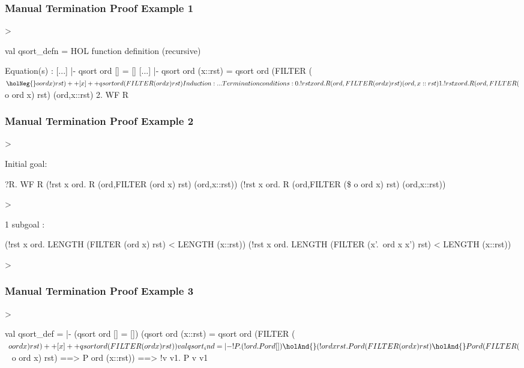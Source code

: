 \begin{frame}[fragile]
\frametitle{Manual Termination Proof Example 1}
\begin{semiverbatim}\scriptsize
> 

val qsort_defn = HOL function definition (recursive)

Equation(s) :
 [...] |- qsort ord [] = []
 [...] |- qsort ord (x::rst) =
            qsort ord (FILTER ($\holNeg{} o ord x) rst) ++ [x] ++
            qsort ord (FILTER (ord x) rst)

Induction : ...

Termination conditions :
  0. !rst x ord. R (ord,FILTER (ord x) rst) (ord,x::rst)
  1. !rst x ord. R (ord,FILTER ($\holNeg{} o ord x) rst) (ord,x::rst)
  2. WF R
\end{semiverbatim}
\end{frame}


\begin{frame}[fragile]
\frametitle{Manual Termination Proof Example 2}
\begin{semiverbatim}\scriptsize
> 

Initial goal:

?R.
  WF R \holAnd{} 
  (!rst x ord. R (ord,FILTER (ord x)      rst) (ord,x::rst)) \holAnd{}
  (!rst x ord. R (ord,FILTER (\$\holNeg{} o ord x) rst) (ord,x::rst))

\pause
> 

1 subgoal :

(!rst x ord. LENGTH (FILTER (ord x) rst) < LENGTH (x::rst)) \holAnd{}
(!rst x ord. LENGTH (FILTER (\textbsl{}x'.\ \holNeg{}ord x x') rst) < LENGTH (x::rst))

> 
\end{semiverbatim}
\end{frame}


\begin{frame}[fragile]
\frametitle{Manual Termination Proof Example 3}
\begin{semiverbatim}\scriptsize
> 

val qsort_def =   
|- (qsort ord [] = []) \holAnd{}
   (qsort ord (x::rst) =
    qsort ord (FILTER ($~ o ord x) rst) ++ [x] ++
    qsort ord (FILTER (ord x) rst))

val qsort_ind =
|- !P. (!ord. P ord []) \holAnd{}
       (!ord x rst.
          P ord (FILTER (ord x) rst) \holAnd{}
          P ord (FILTER ($~ o ord x) rst) ==>
          P ord (x::rst)) ==>
       !v v1. P v v1
\end{semiverbatim}
\end{frame}



